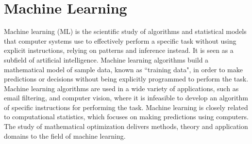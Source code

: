 \section{Machine Learning}
\par Machine learning (ML) is the scientific study of algorithms and statistical models that computer systems use to effectively perform a specific task without using explicit instructions, relying on patterns and inference instead. It is seen as a subfield of artificial intelligence. Machine learning algorithms build a mathematical model of sample data, known as ``training data", in order to make predictions or decisions without being explicitly programmed to perform the task. Machine learning algorithms are used in a wide variety of applications, such as email filtering, and computer vision, where it is infeasible to develop an algorithm of specific instructions for performing the task. Machine learning is closely related to computational statistics, which focuses on making predictions using computers. The study of mathematical optimization delivers methods, theory and application domains to the field of machine learning.
